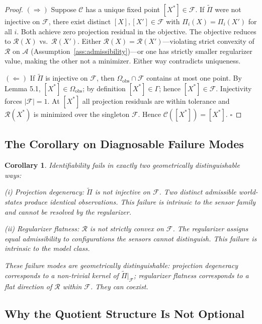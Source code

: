 \documentclass[12pt, oneside]{article}
\newtheorem{corollary}[theorem]{Corollary}
\newcommand{\Ftil}{\widetilde{\Pi}}
\begin{document}
\begin{proof}
$(\Rightarrow)$ Suppose $\mathcal{C}$ has a unique fixed point $[X^*] \in \mathcal{F}$.
If $\Ftil$ were not injective on $\mathcal{F}$, there exist distinct $[X],[X'] \in \mathcal{F}$
with $\Pi_i(X) = \Pi_i(X')$ for all $i$. Both achieve zero projection residual in the
objective. The objective reduces to $\mathcal{R}(X)$ vs.\ $\mathcal{R}(X')$. Either
$\mathcal{R}(X) = \mathcal{R}(X')$---violating strict convexity of $\mathcal{R}$ on
$\mathcal{A}$ (Assumption~\ref{ass:admissibility})---or one has strictly smaller
regularizer value, making the other not a minimizer. Either way contradicts uniqueness.

$(\Leftarrow)$ If $\Ftil$ is injective on $\mathcal{F}$, then $\Omega_{\mathrm{obs}} \cap
\mathcal{F}$ contains at most one point. By Lemma 5.1, $[X^*] \in \Omega_{\mathrm{obs}}$;
by definition $[X^*] \in \Gamma$; hence $[X^*] \in \mathcal{F}$. Injectivity forces
$|\mathcal{F}| = 1$. At $[X^*]$ all projection residuals are within tolerance and
$\mathcal{R}(X^*)$ is minimized over the singleton $\mathcal{F}$. Hence
$\mathcal{C}([X^*]) = [X^*]$. $\square$
\end{proof}

\subsection{The Corollary on Diagnosable Failure Modes}

\begin{corollary}
\label{cor:failures}
Identifiability fails in exactly two geometrically distinguishable ways:

\emph{(i) Projection degeneracy}: $\Ftil$ is not injective on $\mathcal{F}$. Two distinct
admissible world-states produce identical observations. This failure is intrinsic to the
sensor family and cannot be resolved by the regularizer.

\emph{(ii) Regularizer flatness}: $\mathcal{R}$ is not strictly convex on $\mathcal{F}$.
The regularizer assigns equal admissibility to configurations the sensors cannot
distinguish. This failure is intrinsic to the model class.

These failure modes are geometrically distinguishable: projection degeneracy corresponds
to a non-trivial kernel of $\Ftil|_{\mathcal{F}}$; regularizer flatness corresponds to a
flat direction of $\mathcal{R}$ within $\mathcal{F}$. They can coexist.
\end{corollary}

\subsection{Why the Quotient Structure Is Not Optional}
\end{document}
